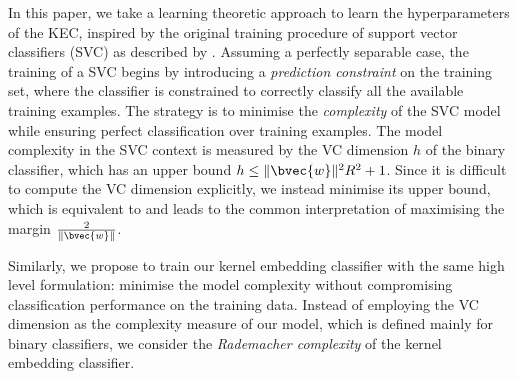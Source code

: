 \documentclass{article}
\begin{document}

	In this paper, we take a learning theoretic approach to learn the hyperparameters of the KEC, inspired by the original training procedure of support vector classifiers (SVC) as described by \cite[p. 185]{m2001introduction}. Assuming a perfectly separable case, the training of a SVC begins by introducing a \textit{prediction constraint} on the training set, where the classifier is constrained to correctly classify all the available training examples. The strategy is to minimise the \textit{complexity} of the SVC model while ensuring perfect classification over training examples. The model complexity in the SVC context is measured by the VC dimension $h$ of the binary classifier, which has an upper bound $h \leq \lVert \bvec{w} \rVert^{2} R^{2} + 1$. Since it is difficult to compute the VC dimension explicitly, we instead minimise its upper bound, which is equivalent to and leads to the common interpretation of maximising the margin $\frac{2}{\lVert \bvec{w} \rVert}$.
	
	Similarly, we propose to train our kernel embedding classifier with the same high level formulation: minimise the model complexity without compromising classification performance on the training data. Instead of employing the VC dimension as the complexity measure of our model, which is defined mainly for binary classifiers, we consider the \textit{Rademacher complexity} \citep{bartlett2002rademacher} of the kernel embedding classifier.
	
	
\end{document}
